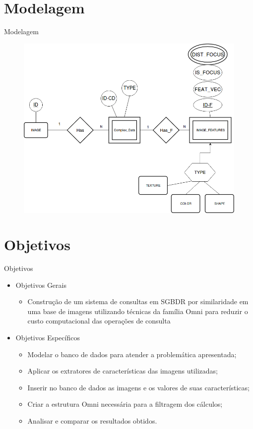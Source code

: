 \documentclass{beamer}
\begin{document}
\section{Modelagem}
\begin{frame}{Modelagem}
    	\begin{figure}[H]
			\centering
			\includegraphics[width=.8\textwidth]{MER.png}
	\end{figure}

\end{frame}

\section{Objetivos}

\begin{frame}{Objetivos}
  \begin{itemize}
   \item Objetivos Gerais
   \begin{itemize}
      \item Construção de um sistema de consultas em SGBDR por similaridade em uma base de imagens utilizando técnicas da família Omni para reduzir o custo computacional das operações de consulta\newline
   \end{itemize}
   \item Objetivos Específicos
   \begin{itemize}
      \item Modelar o banco de dados para atender a problemática apresentada;
      \item Aplicar os extratores de características das imagens utilizadas;
      \item Inserir no banco de dados as imagens e os valores de suas características;
      \item Criar a estrutura Omni necessária para a filtragem dos cálculos;
      \item Analisar e comparar os resultados obtidos.
   \end{itemize}
   
  \end{itemize}

\end{frame}
\end{document}
